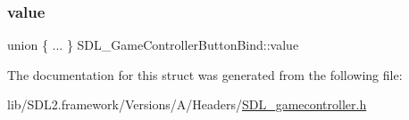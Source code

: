 \mbox{\label{struct_s_d_l___game_controller_button_bind_a617787596bd34e89e7619a585cab0c94}} 
\subsubsection{\texorpdfstring{value}{value}}
{\footnotesize\ttfamily union \{ ... \}   S\+D\+L\+\_\+\+Game\+Controller\+Button\+Bind\+::value}



The documentation for this struct was generated from the following file\+:\begin{DoxyCompactItemize}
\item 
lib/\+S\+D\+L2.\+framework/\+Versions/\+A/\+Headers/\mbox{\hyperlink{_s_d_l__gamecontroller_8h}{S\+D\+L\+\_\+gamecontroller.\+h}}\end{DoxyCompactItemize}
